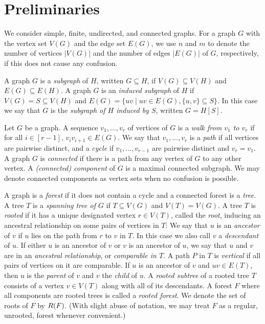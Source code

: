 \documentclass[a4paper,11pt]{article}
\begin{document}
\section{Preliminaries}

We consider simple, finite, undirected, and connected graphs. For a graph $G$ with the vertex set $V(G)$ and the edge set $E(G)$, we use $n$ and $m$ to denote the number of vertices $|V(G)|$ and the number of edges $|E(G)|$ of $G$, respectively, if this does not cause any confusion. 

A graph $G$ is a \emph{subgraph} of $H$,
written $G \subseteq H$, 
if $V(G) \subseteq V(H)$ and $E(G) \subseteq E(H)$.
%
A graph $G$ is an \emph{induced subgraph} of $H$ 
if $V(G) = S \subseteq V(H)$ 
and $E(G) = \{uv \mid uv \in E(G), \{u, v\} \subseteq S\}$.
In this case we say that $G$ is the \emph{subgraph of $H$ induced by $S$}, written $G = H[S]$.

Let $G$ be a graph.
A sequence $v_1, \ldots, v_r$ of vertices of $G$ is a \emph{walk from $v_1$ to $v_r$} 
if for all $i \in [r-1]$, $v_i v_{i+1} \in E(G)$.
We say that $v_1, \ldots, v_r$ is a \emph{path} if all vertices are pairwise distinct,
and a \emph{cycle} if $v_1, \ldots, v_{r-1}$ are pairwise distinct and $v_r = v_1$.
%
A graph $G$ is \emph{connected} if there is a path from any vertex of $G$ to any other vertex.
%
A \emph{(connected) component} of $G$ is a maximal connected subgraph.
We may denote connected components as vertex sets when no confusion is possible.

A graph is a \emph{forest} if it does not contain a cycle and a connected forest is a \emph{tree}.
%
A tree $T$ is a \emph{spanning tree of $G$} if $T \subseteq V(G)$ and $V(T) = V(G)$.
%
A tree $T$ is \emph{rooted} if it has a unique designated vertex $r \in V(T)$, called the \emph{root}, 
inducing an ancestral relationship on some pairs of vertices in $T$:
%
We say that $u$ is an \emph{ancestor} of $v$ if $u$ lies on the path from $r$ to $v$ in $T$.
In this case we also call $v$ a \emph{descendant} of $u$.
%
If either $u$ is an ancestor of $v$ or $v$ is an ancestor of $u$, we say that $u$ and $v$ are in an \emph{ancestral relationship}, or \emph{comparable in $T$}.
%
A path $P$ in $T$ is \emph{vertical} if all pairs of vertices on it are comparable.
%
If $u$ is an ancestor of $v$ and $uv \in E(T)$,
then $u$ is the \emph{parent} of $v$ and $v$ the \emph{child} of $u$.
%
A \emph{rooted subtree} of a rooted tree $T$ consists of a vertex $v \in V(T)$ along with all of its descendants.
%
A forest $F$ where all components are rooted trees is called a \emph{rooted forest}.
We denote the set of roots of $F$ by $R(F)$.
(With slight abuse of notation, we may treat $F$ as a regular, unrooted, forest whenever convenient.)
\end{document}

